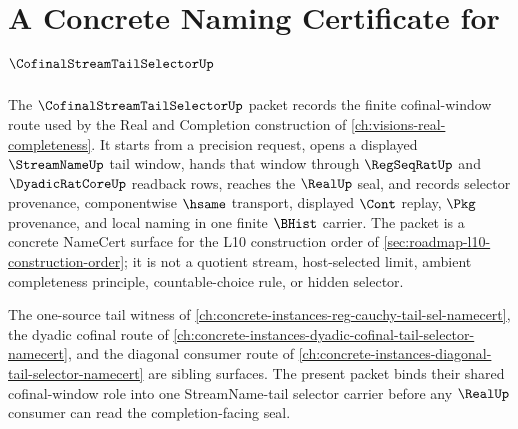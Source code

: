 \chapter{A Concrete Naming Certificate for $\CofinalStreamTailSelectorUp$}
\label{ch:concrete-instances-cofinalstreamtailselector-namecert}

The $\CofinalStreamTailSelectorUp$ packet records the finite cofinal-window route used by the Real and Completion construction of \autoref{ch:visions-real-completeness}. It starts from a precision request, opens a displayed $\StreamNameUp$ tail window, hands that window through $\RegSeqRatUp$ and $\DyadicRatCoreUp$ readback rows, reaches the $\RealUp$ seal, and records selector provenance, componentwise $\hsame$ transport, displayed $\Cont$ replay, $\Pkg$ provenance, and local naming in one finite $\BHist$ carrier. The packet is a concrete NameCert surface for the L10 construction order of \autoref{sec:roadmap-l10-construction-order}; it is not a quotient stream, host-selected limit, ambient completeness principle, countable-choice rule, or hidden selector.

The one-source tail witness of \autoref{ch:concrete-instances-reg-cauchy-tail-sel-namecert}, the dyadic cofinal route of \autoref{ch:concrete-instances-dyadic-cofinal-tail-selector-namecert}, and the diagonal consumer route of \autoref{ch:concrete-instances-diagonal-tail-selector-namecert} are sibling surfaces. The present packet binds their shared cofinal-window role into one StreamName-tail selector carrier before any $\RealUp$ consumer can read the completion-facing seal.

